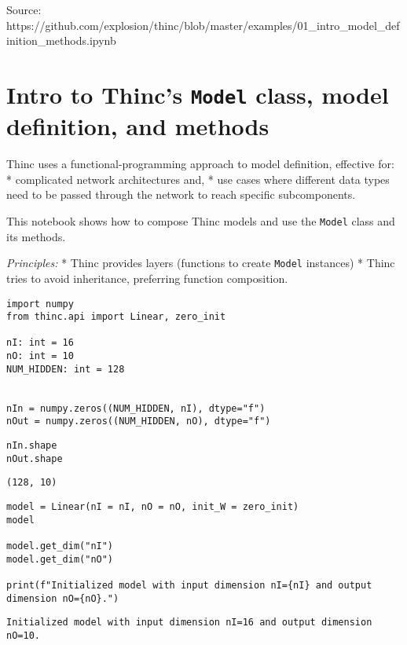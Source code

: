 \documentclass[
]{article}
\author{}
\date{}
\begin{document}
Source:
https://github.com/explosion/thinc/blob/master/examples/01\_intro\_model\_definition\_methods.ipynb

\hypertarget{intro-to-thincs-model-class-model-definition-and-methods}{%
\section{\texorpdfstring{Intro to Thinc's \texttt{Model}
class, model definition, and
methods}{Intro to Thinc's  class, model definition, and methods}}\label{intro-to-thincs-model-class-model-definition-and-methods}}

Thinc uses a functional-programming approach to model definition,
effective for: * complicated network architectures and, * use cases
where different data types need to be passed through the network to
reach specific subcomponents.

This notebook shows how to compose Thinc models and use the
\texttt{Model} class and its methods.

\emph{Principles:} * Thinc provides layers (functions to create
\texttt{Model} instances) * Thinc tries to avoid
inheritance, preferring function composition.

\begin{verbatim}
import numpy
from thinc.api import Linear, zero_init

nI: int = 16
nO: int = 10
NUM_HIDDEN: int = 128


nIn = numpy.zeros((NUM_HIDDEN, nI), dtype="f")
nOut = numpy.zeros((NUM_HIDDEN, nO), dtype="f")
\end{verbatim}

\begin{verbatim}
nIn.shape
nOut.shape
\end{verbatim}

\begin{verbatim}
(128, 10)
\end{verbatim}

\begin{verbatim}
model = Linear(nI = nI, nO = nO, init_W = zero_init)
model

model.get_dim("nI")
model.get_dim("nO")

print(f"Initialized model with input dimension nI={nI} and output dimension nO={nO}.")
\end{verbatim}

\begin{verbatim}
Initialized model with input dimension nI=16 and output dimension nO=10.
\end{verbatim}
\end{document}
